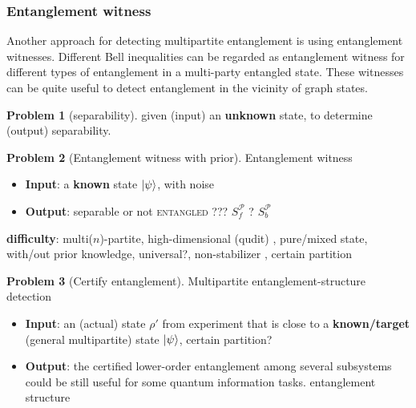 \documentclass[
10pt,
aps,
pra,
linenumbers,
floatfix,
]{revtex4-2}
\theoremstyle{plain}
\theoremstyle{definition}
\newtheorem{problem}{Problem}
\newcommand{\separable}{S}
\newcommand{\ppartition}{\mathcal{P}}
\newcommand{\dm}{\rho}
\begin{document}
\subsubsection{Entanglement witness}\label{sec:entanglement_witness}
Another approach for detecting multipartite entanglement is using entanglement witnesses.
Different Bell inequalities can be regarded as entanglement witness for different types of entanglement in a multi-party entangled state.
These witnesses can be quite useful to detect entanglement in the vicinity of graph states.
\begin{problem}[separability]\label{prm:separable}
	given (input) an \textbf{unknown} state, to determine (output) separability.
\end{problem}
\begin{problem}[Entanglement witness with prior]
	Entanglement witness	
		\begin{itemize}
		\item \textbf{Input}: a \textbf{known} state $\ket{\psi}$, with noise
		\item \textbf{Output}: \textsf{separable} or not \textsc{entangled} ??? $\separable_f^\ppartition$ ? $\separable_b^\ppartition$ 
	\end{itemize}
	\textbf{difficulty}: multi($n$)-partite, high-dimensional (qudit) \cite{sciaraUniversalPartiteLevel2019}, pure/mixed state, with/out prior knowledge, universal?, non-stabilizer \cite{tothEntanglementDetectionStabilizer2005}, certain partition
\end{problem}
\begin{problem}[Certify entanglement]
	Multipartite entanglement-structure detection
	\begin{itemize}
		\item \textbf{Input}: an (actual) state $\dm'$ from experiment that is close to a \textbf{known/target} (general multipartite) state $\ket{\psi}$,
		certain partition?
		\item \textbf{Output}: the certified lower-order entanglement among several subsystems could be still useful for some quantum information tasks.
		entanglement structure
	\end{itemize}
\end{problem}
\end{document}
